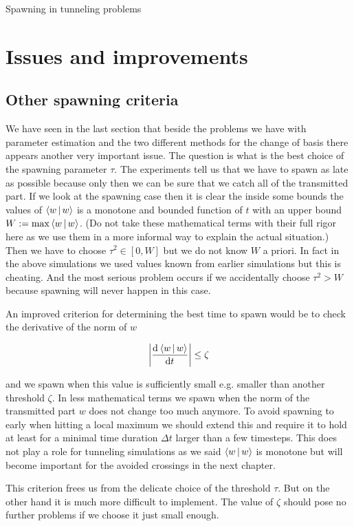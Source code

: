 \begin{chapter}{Spawning in tunneling problems}
\FloatBarrier
\section{Issues and improvements}

\subsection{Other spawning criteria}

We have seen in the last section that beside the problems we have with parameter
estimation and the two different methods for the change of basis there appears
another very important issue. The question is what is the best choice of the
spawning parameter $\tau$. The experiments tell us that we have to spawn as late
as possible because only then we can be sure that we catch all of the transmitted
part. If we look at the spawning case then it is clear the inside some bounds
the values of $\Braket{w|w}$ is a monotone and bounded function of $t$ with
an upper bound $W := \max \Braket{w|w}$. (Do not take these mathematical
terms with their full rigor here as we use them in a more informal way to
explain the actual situation.) Then we have to choose $\tau^2 \in \left[0, W\right]$
but we do not know $W$ a priori. In fact in the above simulations we used values
known from earlier simulations but this is cheating. And the most serious problem
occurs if we accidentally choose $\tau^2 > W$ because spawning will never happen
in this case.

An improved criterion for determining the best time to spawn would be to check
the derivative of the norm of $w$

\begin{equation}
  \left| \frac{\mathrm{d}^{}\Braket{w|w}}{\mathrm{d}t^{}} \right| \leq \zeta
\end{equation}

and we spawn when this value is sufficiently small e.g. smaller than another
threshold $\zeta$. In less mathematical terms we spawn when the norm of the transmitted
part $w$ does not change too much anymore. To avoid spawning to early when hitting
a local maximum we should extend this and require it to hold at least for a
minimal time duration $\Delta t$ larger than a few timesteps. This does not
play a role for tunneling simulations as we said $\Braket{w|w}$ is monotone but
will become important for the avoided crossings in the next chapter.

This criterion frees us from the delicate choice of the threshold $\tau$. But
on the other hand it is much more difficult to implement. The value of $\zeta$
should pose no further problems if we choose it just small enough.


\end{chapter}
